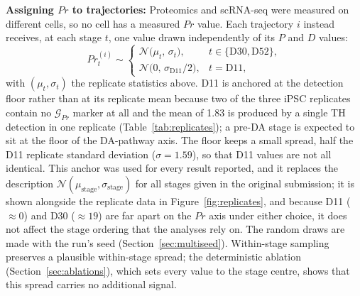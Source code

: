 \documentclass[5p,times,twocolumn]{elsarticle}
\newcommand{\rtag}[1]{}
\newenvironment{revblock}[1]{\par\rtag{#1}\ignorespaces}{\par}
\begin{document}
\begin{revblock}{R1.2,R2.6,AC}
  \textbf{Assigning $Pr$ to trajectories:}
  Proteomics and scRNA-seq were measured on different cells, so
  no cell has a measured $Pr$ value. Each trajectory $i$ instead
  receives, at each stage $t$, one value drawn independently of
  its $P$ and $D$ values:
  \begin{equation}
  Pr^{(i)}_{t} \sim
  \begin{cases}
    \mathcal{N}\bigl(\mu_{t},\, \sigma_{t}\bigr),
      & t \in \{\text{D30}, \text{D52}\},\\[2pt]
    \mathcal{N}\bigl(0,\, \sigma_{\text{D11}}/2\bigr),
      & t = \text{D11},
  \end{cases}
  \label{eq:prsample}
  \end{equation}
  with $(\mu_{t}, \sigma_{t})$ the replicate statistics above.
  D11 is anchored at the detection floor rather than at its
  replicate mean because two of the three iPSC replicates contain
  no $\mathcal{G}_{Pr}$ marker at all and the mean of 1.83 is
  produced by a single TH detection in one replicate
  (Table~\ref{tab:replicates}); a pre-DA stage is expected to sit
  at the floor of the DA-pathway axis. The floor keeps a small
  spread, half the D11 replicate standard deviation
  ($\sigma = 1.59$), so that D11 values are not all identical.
  This anchor was used for every result reported, and it
  replaces the description $\mathcal{N}(\mu_{\text{stage}},
\sigma_{\text{stage}})$ for all stages given in the original
  submission;
  it is shown alongside the replicate data in
  Figure~\ref{fig:replicates}, and because D11 ($\approx 0$)
  and D30 ($\approx 19$) are far apart on the $Pr$ axis under
  either choice, it does not affect the stage ordering that the
  analyses rely on.
  The random draws are made with the run's seed
  (Section~\ref{sec:multiseed}).
  Within-stage sampling preserves a plausible within-stage
  spread; the deterministic ablation
  (Section~\ref{sec:ablations}), which sets every value to the
  stage centre, shows that this spread carries no additional
  signal.
\end{revblock}
\end{document}
